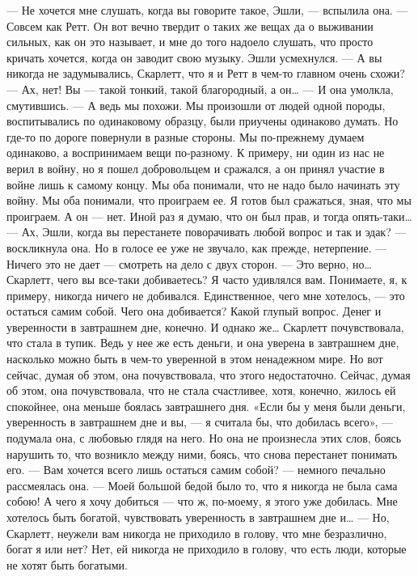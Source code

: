 — Не хочется мне слушать, когда вы говорите такое, Эшли, — вспылила она. — Совсем как Ретт. Он вот вечно твердит о таких же вещах да о выживании сильных, как он это называет, и мне до того надоело слушать, что просто кричать хочется, когда он заводит свою музыку. Эшли усмехнулся.
— А вы никогда не задумывались, Скарлетт, что я и Ретт в чем-то главном очень схожи?
— Ах, нет! Вы — такой тонкий, такой благородный, а он… — И она умолкла, смутившись.
— А ведь мы похожи. Мы произошли от людей одной породы, воспитывались по одинаковому образцу, были приучены одинаково думать. Но где-то по дороге повернули в разные стороны. Мы по-прежнему думаем одинаково, а воспринимаем вещи по-разному. К примеру, ни один из нас не верил в войну, но я пошел добровольцем и сражался, а он принял участие в войне лишь к самому концу. Мы оба понимали, что не надо было начинать эту войну. Мы оба понимали, что проиграем ее. Я готов был сражаться, зная, что мы проиграем. А он — нет. Иной раз я думаю, что он был прав, и тогда опять-таки…
— Ах, Эшли, когда вы перестанете поворачивать любой вопрос и так и эдак? — воскликнула она. Но в голосе ее уже не звучало, как прежде, нетерпение. — Ничего это не дает — смотреть на дело с двух сторон.
— Это верно, но… Скарлетт, чего вы все-таки добиваетесь? Я часто удивлялся вам. Понимаете, я, к примеру, никогда ничего не добивался. Единственное, чего мне хотелось, — это остаться самим собой.
Чего она добивается? Какой глупый вопрос. Денег и уверенности в завтрашнем дне, конечно. И однако же… Скарлетт почувствовала, что стала в тупик. Ведь у нее же есть деньги, и она уверена в завтрашнем дне, насколько можно быть в чем-то уверенной в этом ненадежном мире. Но вот сейчас, думая об этом, она почувствовала, что этого недостаточно. Сейчас, думая об этом, она почувствовала, что не стала счастливее, хотя, конечно, жилось ей спокойнее, она меньше боялась завтрашнего дня. «Если бы у меня были деньги, уверенность в завтрашнем дне и вы, — я считала бы, что добилась всего», — подумала она, с любовью глядя на него. Но она не произнесла этих слов, боясь нарушить то, что возникло между ними, боясь, что снова перестанет понимать его.
— Вам хочется всего лишь остаться самим собой? — немного печально рассмеялась она. — Моей большой бедой было то, что я никогда не была сама собою! А чего я хочу добиться — что ж, по-моему, я этого уже добилась. Мне хотелось быть богатой, чувствовать уверенность в завтрашнем дне и…
— Но, Скарлетт, неужели вам никогда не приходило в голову, что мне безразлично, богат я или нет?
Нет, ей никогда не приходило в голову, что есть люди, которые не хотят быть богатыми.
